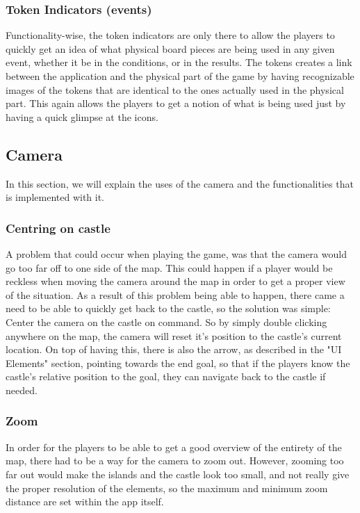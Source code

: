 \subsubsection{Token Indicators (events)}
	
Functionality-wise, the token indicators are only there to allow the players to quickly get an idea of what physical board pieces are being used in any given event, whether it be in the conditions, or in the results. The tokens creates a link between the application and the physical part of the game by having recognizable images of the tokens that are identical to the ones actually used in the physical part. This again allows the players to get a notion of what is being used just by having a quick glimpse at the icons.

\subsection{Camera}

In this section, we will explain the uses of the camera and the functionalities that is implemented with it. 

\subsubsection{Centring on castle}

A problem that could occur when playing the game, was that the camera would go too far off to one side of the map. This could happen if a player would be reckless when moving the camera around the map in order to get a proper view of the situation. As a result of this problem being able to happen, there came a need to be able to quickly get back to the castle, so the solution was simple: Center the camera on the castle on command. So by simply double clicking anywhere on the map, the camera will reset it's position to the castle's current location. On top of having this, there is also the arrow, as described in the "UI Elements" section, pointing towards the end goal, so that if the players know the castle's relative position to the goal, they can navigate back to the castle if needed. 

\subsubsection{Zoom}
	
In order for the players to be able to get a good overview of the entirety of the map, there had to be a way for the camera to zoom out. However, zooming too far out would make the islands and the castle look too small, and not really give the proper resolution of the elements, so the maximum and minimum zoom distance are set within the app itself.	

